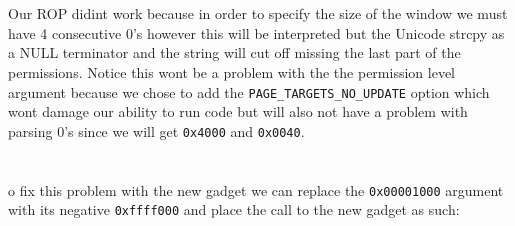 \documentclass{article}
\begin{document}
\section{}
Our ROP didint work because in order to specify the size of the window we must have 4
consecutive 0's however this will be interpreted but the Unicode strcpy as a NULL
terminator and the string will cut off missing the last part of the permissions. Notice this
wont be a problem with the the permission level argument because we chose to add the
\texttt{PAGE\_TARGETS\_NO\_UPDATE} option which wont damage our ability to run code but will
also not have a problem with parsing 0's since we will get \texttt{0x4000} and \texttt{0x0040}.

\section{}
o fix this problem with the new gadget we can replace the \texttt{0x00001000} argument with
its negative \texttt{0xffff000} and place the call to the new gadget as such:
\end{document}
